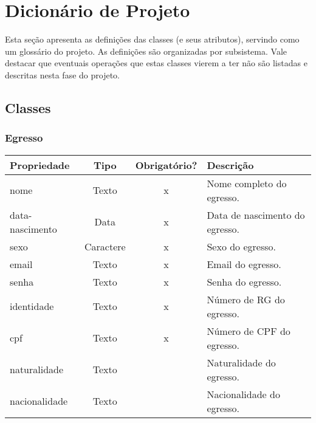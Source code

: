 \chapter{Dicionário de Projeto}
\label{sec-dicionario}
\setcounter{table}{0}

Esta seção apresenta as definições das classes (e seus atributos), servindo como um glossário do projeto. As definições são organizadas por subsistema. Vale destacar que eventuais operações que estas classes vierem a ter não são listadas e descritas nesta fase do projeto.


\section{Classes}

\subsection{Egresso} \label{Egresso}
\begin{table}[h!]
	\footnotesize
	\begin{tabular}{|p{2.6cm}|c|c|p{7.8cm}|}   \hline \rowcolor[rgb]{0.8,0.8,0.8}
		
 		
 		\textbf{Propriedade} & \textbf{Tipo} & \textbf{Obrigatório?} & \centerline{\textbf{Descrição}} \\\hline  
 		                            
		nome & Texto & x & Nome completo do egresso. \\\hline  	
		
		data-nascimento & Data & x & Data de nascimento do egresso. \\\hline	
 		
		sexo & Caractere & x & Sexo do egresso. \\\hline 
		
		email & Texto & x & Email do egresso. \\\hline
		
		senha & Texto & x & Senha do egresso. \\\hline
		                             
		identidade & Texto & x & Número de RG do egresso. \\\hline
		
		cpf & Texto & x & Número de CPF do egresso. \\\hline
		
		naturalidade & Texto & & Naturalidade do egresso. \\\hline
		
		nacionalidade & Texto & & Nacionalidade do egresso. \\\hline
		
	\end{tabular}	
\end{table}


